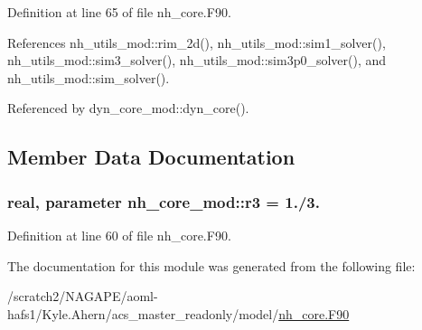 Definition at line 65 of file nh\-\_\-core.\-F90.



References nh\-\_\-utils\-\_\-mod\-::rim\-\_\-2d(), nh\-\_\-utils\-\_\-mod\-::sim1\-\_\-solver(), nh\-\_\-utils\-\_\-mod\-::sim3\-\_\-solver(), nh\-\_\-utils\-\_\-mod\-::sim3p0\-\_\-solver(), and nh\-\_\-utils\-\_\-mod\-::sim\-\_\-solver().



Referenced by dyn\-\_\-core\-\_\-mod\-::dyn\-\_\-core().



\subsection{Member Data Documentation}
\subsubsection[{r3}]{\setlength{\rightskip}{0pt plus 5cm}real, parameter nh\-\_\-core\-\_\-mod\-::r3 = 1./3.\hspace{0.3cm}{\ttfamily [private]}}\label{classnh__core__mod_ae83e5bc4677454ff2be94ad7952e85bd}


Definition at line 60 of file nh\-\_\-core.\-F90.



The documentation for this module was generated from the following file\-:\begin{DoxyCompactItemize}
\item 
/scratch2/\-N\-A\-G\-A\-P\-E/aoml-\/hafs1/\-Kyle.\-Ahern/acs\-\_\-master\-\_\-readonly/model/\hyperlink{nh__core_8F90}{nh\-\_\-core.\-F90}\end{DoxyCompactItemize}
